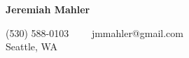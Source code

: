 \begin{center}

{\LARGE \textbf{Jeremiah Mahler}}

\vspace{0.2em}
(530) 588-0103\ \ \textbullet
\ \ jmmahler@gmail.com \\
Seattle, WA

\end{center}
